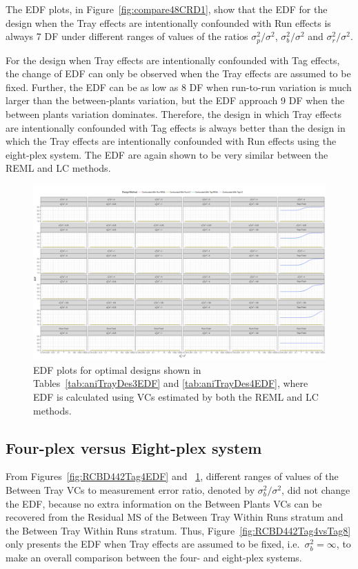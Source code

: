The EDF plots, in Figure~\ref{fig:compare48CRD1}, show that the EDF for the design when the Tray effects are intentionally confounded with Run effects is always 7 DF under different ranges of values of the ratios $\sigma_p^2/\sigma^2$, $\sigma_b^2/\sigma^2$ and $\sigma_r^2/\sigma^2$. 

For the design when Tray effects are intentionally confounded with Tag effects, the change of EDF can only be observed when the Tray effects are assumed to be fixed. Further, the EDF can be as low as 8 DF when run-to-run variation is much larger than the between-plants variation, but the EDF approach 9 DF when the between plants variation dominates. Therefore, the design in which Tray effects are intentionally confounded with Tag effects is always better than the design in which the Tray effects are intentionally confounded with Run effects using the eight-plex system. The EDF are again shown to be very similar between the REML and LC methods.

\begin{landscape}
\begin{figure}[h!]
\centering
\includegraphics[width=1.3 \textwidth]{Chapter5/Graph/CRD44428.pdf}
\caption{EDF plots for optimal designs shown in Tables~\ref{tab:aniTrayDes3EDF} and \ref{tab:aniTrayDes4EDF}, where EDF is calculated using VCs estimated by both the REML and LC methods.}
\label{fig:RCBD442Tag8EDF}
\end{figure}
\end{landscape}

\subsection{Four-plex versus Eight-plex system}
From Figures~\ref{fig:RCBD442Tag4EDF} and ~\ref{fig:RCBD442Tag8EDF}, different ranges of values of the Between Tray VCs to measurement error ratio, denoted by $\sigma_{b}^2/\sigma^2$, did not change the EDF, because no extra information on the Between Plants VCs can be recovered from the Residual MS of the Between Tray Within Runs stratum and the Between Tray Within Runs stratum. Thus, Figure~\ref{fig:RCBD442Tag4vsTag8} only presents the EDF when Tray effects are assumed to be fixed, i.e.\ $\sigma_{b}^2 = \infty$, to make an overall comparison between the four- and eight-plex systems. 

